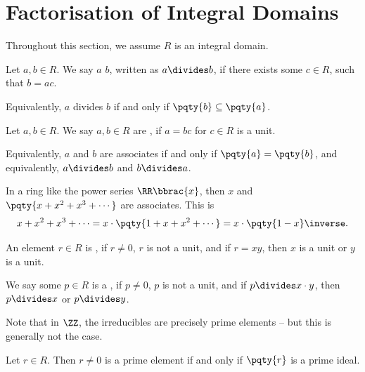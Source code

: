 \section{Factorisation of Integral Domains}

Throughout this section, we assume \(R\) is an integral domain.

\begin{definition}[Divisor]
    \label{def:divisor}%
    Let \(a, b \in R\). We say \(a\)  \(b\), written as \(a \divides b\), if there exists some \(c \in R\), such that \(b = ac\).

    Equivalently, \(a\) divides \(b\) if and only if \(\pqty{b} \subseteq \pqty{a}\).
\end{definition}

\begin{definition}[Associate]
    \label{def:associate}%
    Let \(a, b \in R\). We say \(a, b \in R\) are , if \(a = bc\) for \(c \in R\) is a unit.

    Equivalently, \(a\) and \(b\) are associates if and only if \(\pqty{a} = \pqty{b}\), and equivalently, \(a \divides b\) and \(b \divides a\).
\end{definition}

In a ring like the power series \(\RR\bbrac{x}\), then \(x\) and \(\pqty{x + x^2 + x^3 + \cdots}\) are associates. This is
\[
    x + x^2 + x^3 + \cdots = x \cdot \pqty{1 + x + x^2 + \cdots} = x \cdot \pqty{1 - x}\inverse.
\]

\begin{definition}[Irreducible]
    \label{def:irreducible}%
    An element \(r \in R\) is , if \(r \neq 0\), \(r\) is not a unit, and if \(r = xy\), then \(x\) is a unit or \(y\) is a unit.
\end{definition}

\begin{definition}
    \label{def:prime-element}%
    We say some \(p \in R\) is a , if \(p \neq 0\), \(p\) is not a unit, and if \(p \divides x \cdot y\), then \(p \divides x\) or \(p \divides y\).
\end{definition}

Note that in \(\ZZ\), the irreducibles are precisely prime elements -- but this is generally not the case.

\begin{proposition}
    \label{prop:prime-element-ideal}%
    Let \(r \in R\). Then \(r \neq 0\) is a prime element if and only if \(\pqty{r}\) is a prime ideal.
\end{proposition}

